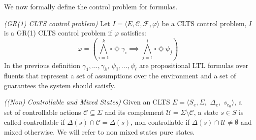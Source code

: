 

%

We now formally define the control problem for \gr formulas.

\begin{definition}\label{def:gr1_clts_control_problem} \emph{(GR(1) CLTS control problem)} 
	Let $I = \langle E, \mathcal{C}, \mathcal{F}, \varphi \rangle$ be a CLTS control problem, $I$ is a GR(1) CLTS control problem if $\varphi$ satisfies: 
	\[\varphi = (\bigwedge_{i=1}^k\square \Diamond \gamma_i \implies \bigwedge_{j=1}^l\square \Diamond \psi_j)\]
	In the previous definition $\gamma_1, \ldots , \gamma_k$, $\psi_1, \ldots , \psi_l$ are propositional LTL formulas over fluents that represent a set of assumptions over the environment and a set of guarantees the system should satisfy.
\end{definition}

\begin{definition}\label{def:state-characterization}\emph{((Non) Controllable and Mixed States)}
Given an CLTS $E = \langle S_e,\Sigma,$ $\Delta_e,$ $s_{e_0}\rangle$, a set of controllable actions $\mathcal{C} \subseteq \Sigma$ and its complement $\mathcal{U} = \Sigma \setminus \mathcal{C}$,  a state $s \in S$ is called controllable if $\Delta(s) \cap \mathcal{C} = \Delta(s)$, non controllable if $\Delta(s) \cap \mathcal{U} \neq \emptyset$ and mixed otherwise.  We will refer to non mixed states pure states.
\end{definition}

